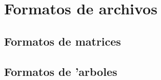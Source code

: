 \chapter{Formatos de archivos}
\section{Formatos de matrices}





\section{Formatos de 'arboles}




